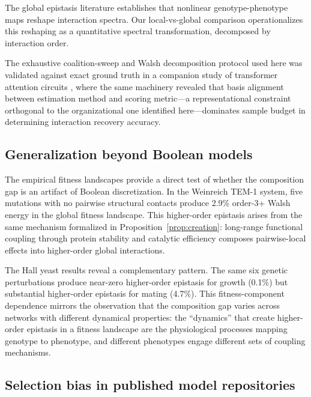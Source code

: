\documentclass[10pt]{article}
\begin{document}
The global epistasis literature \citep{otwinowski2018inferring, reddy2021global} establishes that nonlinear genotype-phenotype maps
reshape interaction spectra. Our local-vs-global comparison
operationalizes this reshaping as a quantitative spectral
transformation, decomposed by interaction order.

The exhaustive coalition-sweep and Walsh decomposition protocol used
here was validated against exact ground truth in a companion study
of transformer attention circuits \citep{tower2026epistasis}, where the same machinery revealed that basis alignment
between estimation method and scoring metric---a representational
constraint orthogonal to the organizational one identified
here---dominates sample budget in determining interaction recovery
accuracy.


\subsection{Generalization beyond Boolean models}

The empirical fitness landscapes provide a direct test of whether
the composition gap is an artifact of Boolean discretization. In
the Weinreich TEM-1 system, five mutations with no pairwise
structural contacts produce 2.9\% order-3+ Walsh energy in the
global fitness landscape. This higher-order epistasis arises from
the same mechanism formalized in Proposition~\ref{prop:creation}:
long-range functional coupling through protein stability and
catalytic efficiency composes pairwise-local effects into
higher-order global interactions.

The Hall yeast results reveal a complementary pattern. The same
six genetic perturbations produce near-zero higher-order epistasis
for growth (0.1\%) but substantial higher-order epistasis for
mating (4.7\%). This fitness-component dependence mirrors the
observation that the composition gap varies across networks with
different dynamical properties: the ``dynamics'' that create
higher-order epistasis in a fitness landscape are the physiological
processes mapping genotype to phenotype, and different phenotypes
engage different sets of coupling mechanisms.


\subsection{Selection bias in published model repositories}
\end{document}
